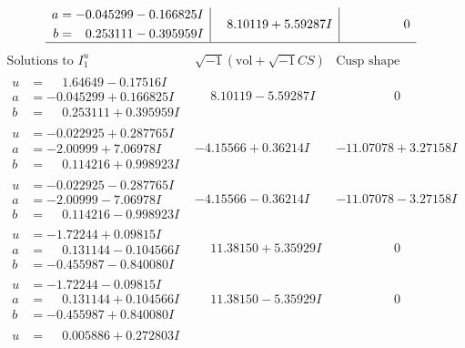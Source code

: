 \documentclass[1p]{elsarticle_modified}
\theoremstyle{definition}
\newcommand{\I}{\sqrt{-1}}
\begin{document}
$$\begin{array}{c|c|c}
\begin{aligned}
a &= -0.045299 - 0.166825 I \\
b &= \phantom{-}0.253111 - 0.395959 I\end{aligned}
 & \phantom{-}8.10119 + 5.59287 I & \phantom{-0.000000 } 0\\
 \hline 
 \end{array}$$\newpage$$\begin{array}{c|c|c}  
\text{Solutions to }I^u_{1}& \I (\text{vol} + \sqrt{-1}CS) & \text{Cusp shape}\\
 \hline 
\begin{aligned}
u &= \phantom{-}1.64649 - 0.17516 I \\
a &= -0.045299 + 0.166825 I \\
b &= \phantom{-}0.253111 + 0.395959 I\end{aligned}
 & \phantom{-}8.10119 - 5.59287 I & \phantom{-0.000000 } 0 \\ \hline\begin{aligned}
u &= -0.022925 + 0.287765 I \\
a &= -2.00999 + 7.06978 I \\
b &= \phantom{-}0.114216 + 0.998923 I\end{aligned}
 & -4.15566 + 0.36214 I & -11.07078 + 3.27158 I \\ \hline\begin{aligned}
u &= -0.022925 - 0.287765 I \\
a &= -2.00999 - 7.06978 I \\
b &= \phantom{-}0.114216 - 0.998923 I\end{aligned}
 & -4.15566 - 0.36214 I & -11.07078 - 3.27158 I \\ \hline\begin{aligned}
u &= -1.72244 + 0.09815 I \\
a &= \phantom{-}0.131144 - 0.104566 I \\
b &= -0.455987 - 0.840080 I\end{aligned}
 & \phantom{-}11.38150 + 5.35929 I & \phantom{-0.000000 } 0 \\ \hline\begin{aligned}
u &= -1.72244 - 0.09815 I \\
a &= \phantom{-}0.131144 + 0.104566 I \\
b &= -0.455987 + 0.840080 I\end{aligned}
 & \phantom{-}11.38150 - 5.35929 I & \phantom{-0.000000 } 0 \\ \hline\begin{aligned}
u &= \phantom{-}0.005886 + 0.272803 I \\

\end{aligned}
\end{array}$$
\end{document}
